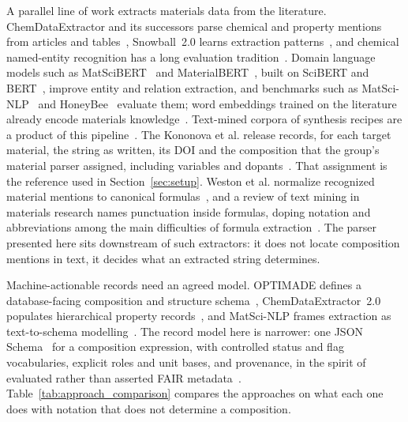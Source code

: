 \documentclass[10pt,journal]{IEEEtran}
\begin{document}
A parallel line of work extracts materials data from the literature. ChemDataExtractor and its successors parse chemical and property mentions from articles and tables~\cite{swain2016chemdataextractor,chemdataextractor2021}, Snowball~2.0 learns extraction patterns~\cite{snowball2023}, and chemical named-entity recognition has a long evaluation tradition~\cite{krallinger2015chemdner}. Domain language models such as MatSciBERT~\cite{matscibert2022} and MaterialBERT~\cite{materialbert2022}, built on SciBERT and BERT~\cite{beltagy2019scibert,devlin2019bert}, improve entity and relation extraction, and benchmarks such as MatSci-NLP~\cite{matscinlp2023} and HoneyBee~\cite{honeybee2023} evaluate them; word embeddings trained on the literature already encode materials knowledge~\cite{tshitoyan2019embeddings}. Text-mined corpora of synthesis recipes are a product of this pipeline~\cite{kononova2019textmined,olivetti2020nlp}. The Kononova et al. release records, for each target material, the string as written, its DOI and the composition that the group's material parser assigned, including variables and dopants~\cite{kononova2019textmined,textminedrepo2023}. That assignment is the reference used in Section~\ref{sec:setup}. Weston et al. normalize recognized material mentions to canonical formulas~\cite{weston2019ner}, and a review of text mining in materials research names punctuation inside formulas, doping notation and abbreviations among the main difficulties of formula extraction~\cite{kononova2021opportunities}. The parser presented here sits downstream of such extractors: it does not locate composition mentions in text, it decides what an extracted string determines.

Machine-actionable records need an agreed model. OPTIMADE defines a database-facing composition and structure schema~\cite{optimade2024}, ChemDataExtractor~2.0 populates hierarchical property records~\cite{chemdataextractor2021}, and MatSci-NLP frames extraction as text-to-schema modelling~\cite{matscinlp2023}. The record model here is narrower: one JSON Schema~\cite{jsonschema2020} for a composition expression, with controlled status and flag vocabularies, explicit roles and unit bases, and provenance, in the spirit of evaluated rather than asserted FAIR metadata~\cite{jacobsen2020interpretations,wilkinson2019maturity,gebru2021datasheets,himanen2019datadriven}. Table~\ref{tab:approach_comparison} compares the approaches on what each one does with notation that does not determine a composition.
\end{document}
